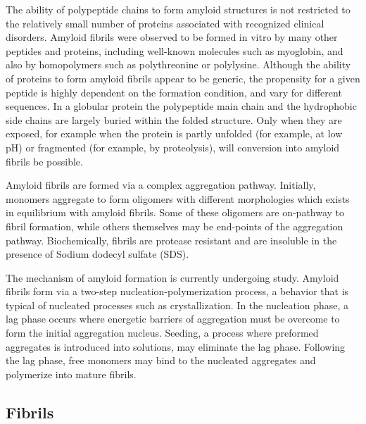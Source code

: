 The ability of polypeptide chains to form amyloid structures is not restricted to the relatively small number of proteins associated with recognized clinical disorders. Amyloid fibrils were observed to be formed in vitro by many other peptides and proteins, including well-known molecules such as myoglobin, and also by homopolymers such as polythreonine or polylysine.  
Although the ability of proteins to form amyloid fibrils appear to be generic, the propensity for a given peptide is highly dependent on the formation condition, and vary for different sequences. 
In a globular protein the polypeptide main chain and the hydrophobic side chains are largely buried within the folded structure. Only when they are exposed, for example when the protein is partly unfolded (for example, at low pH) or fragmented (for example, by proteolysis), will conversion into amyloid fibrils be possible.

Amyloid fibrils are formed via a complex aggregation pathway. Initially, monomers aggregate to form oligomers with different morphologies which exists in equilibrium with amyloid fibrils. Some of these oligomers are on-pathway to fibril formation, while others themselves may be end-points of the aggregation pathway. Biochemically, fibrils are protease resistant and are insoluble in the presence of Sodium dodecyl sulfate (SDS).

The mechanism of amyloid formation is currently undergoing study. Amyloid fibrils form via a two-step nucleation-polymerization process, a behavior that is typical of nucleated processes such as crystallization.  In the nucleation phase, a lag phase occurs where energetic barriers of aggregation must be overcome to form the initial aggregation nucleus. Seeding, a process where preformed aggregates is introduced into solutions, may eliminate the lag phase.  Following the lag phase, free monomers may bind to the nucleated aggregates and polymerize into mature fibrils.\cite{Murphy:2002fe} 

\subsection{Fibrils}

